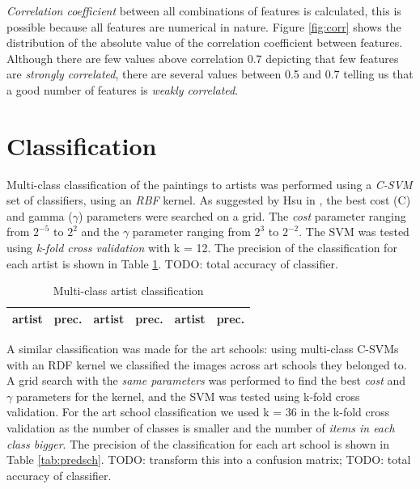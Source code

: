 \documentclass[11pt,a4paper,twoside,openright]{report}
\begin{document}
\emph{Correlation coefficient} between all combinations of features is
calculated, this is possible because all features are numerical in nature.
Figure \ref{fig:corr} shows the distribution of the absolute value of the
correlation coefficient between features.  Although there are few values above
correlation 0.7 depicting that few features are \emph{strongly correlated},
there are several values between 0.5 and 0.7 telling us that a good number of
features is \emph{weakly correlated}.

\section{Classification}

Multi-class classification of the paintings to artists was performed using a
\emph{C-SVM} set of classifiers, using an \emph{RBF} kernel.  As suggested by
Hsu in \cite{hcl03svm}, the best cost (C) and gamma ($\gamma$) parameters were
searched on a grid.  The \emph{cost} parameter ranging from $2^{-5}$ to $2^2$
and the $\gamma$ parameter ranging from $2^3$ to $2^{-2}$.  The SVM was tested
using \emph{k-fold cross validation} with k = 12.  The precision of the
classification for each artist is shown in Table \ref{tab:predart}.  TODO:
total accuracy of classifier.

\begin{table}[tpb]
\centering
\begin{tabular}{|l|r||l|r||l|r|}
\toprule
artist & prec. & artist & prec. & artist & prec. \\
\midrule

\bottomrule
\end{tabular}
\caption[Multi-class artist classification]{Multi-class artist classification}
\label{tab:predart}
\end{table}

A similar classification was made for the art schools: using multi-class C-SVMs
with an RDF kernel we classified the images across art schools they belonged
to.  A grid search with the \emph{same parameters} was performed to find the
best \emph{cost} and $\gamma$ parameters for the kernel, and the SVM was tested
using k-fold cross validation.  For the art school classification we used k =
36 in the k-fold cross validation as the number of classes is smaller and the
number of \emph{items in each class bigger}.  The precision of the
classification for each art school is shown in Table \ref{tab:predsch}.  TODO:
transform this into a confusion matrix; TODO: total accuracy of classifier.
\end{document}
